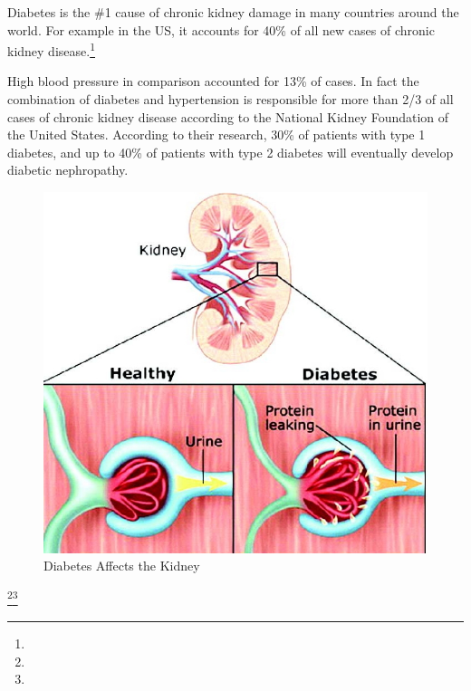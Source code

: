 {

Diabetes is the \#1 cause of chronic kidney damage in many countries around the world. For example in the US, it accounts for 40\% of all new cases of chronic kidney disease.\footnote{}

 High blood pressure in comparison accounted for 13\% of cases. In fact the combination of diabetes and hypertension is responsible for more than 2/3 of all cases of chronic kidney disease according to the National Kidney Foundation of the United States. According to their research, 30\% of patients with type 1 diabetes, and up to 40\% of patients with type 2 diabetes will eventually develop diabetic nephropathy.

\begin{figure}
\caption{Diabetes Affects the Kidney}
\includegraphics{images/048.jpg}
\end{figure}

\footnote{}\footnote{}

}
